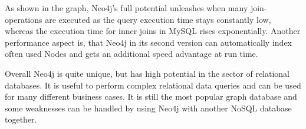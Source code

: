 As shown in the graph, Neo4j's full potential unleashes when many join-operations are executed as the query execution time stays constantly low, whereas the execution time for inner joins in MySQL rises exponentially. Another performance aspect is, that Neo4j in its second version can automatically index often used Nodes and gets an additional speed advantage at run time.

Overall Neo4j is quite unique, but has high potential in the sector of relational databases.
It is useful to perform complex relational data queries and can be used for many different business cases.
It is still the most popular graph database and some weaknesses can be handled by using Neo4j with another NoSQL database together.
